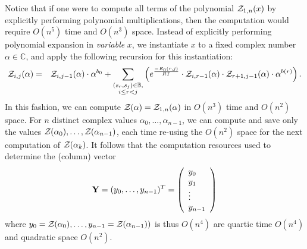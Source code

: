 Notice that if one were to compute all terms of the polynomial ${\mathcal Z}_{1,n}(x)$
by explicitly performing polynomial multiplications,
then the computation would require $O(n^5)$ time and $O(n^3)$ space.
Instead of explicitly performing polynomial expansion in {\em variable} $x$,
we instantiate $x$ to a fixed complex number $\alpha \in \mathbb{C}$, and apply
the following recursion for this instantiation:
\begin{eqnarray}
\label{eqn:RNAborNussRecursionInstantiated}
\emZof{i,j}{\alpha} &= &\emZof{i,j-1}{\alpha} \cdot \alpha^{b_0} +
\sum_{\substack{(s_r,s_j) \in \mathbb{B},\\i\le r<j}}
\left(e^{\frac{-E_0(r,j)}{RT}}\cdot
\emZof{i,r-1}{\alpha}\cdot\emZof{r+1,j-1}{\alpha}\cdot \alpha^{b(r)} \right).
\end{eqnarray}
In this fashion, we can compute ${\mathcal Z}_{}(\alpha)={\mathcal Z}_{1,n}(\alpha)$ in
$O(n^3)$ time and $O(n^2)$ space. For $n$ distinct complex values
$\alpha_0,\ldots,\alpha_{n-1}$, we can compute and save only the
values ${\mathcal Z}_{}(\alpha_0),\ldots, {\mathcal Z}_{}(\alpha_{n-1})$, each time re-using the
$O(n^2)$ space for the next computation of ${\mathcal Z}_{}(\alpha_k)$. It follows that
the computation resources used to determine the (column) vector
\begin{eqnarray}
\label{eqn:defY}
{\bf Y} = (y_0,\ldots,y_{n-1})^T =
\left(
\begin{array}{l}
y_0\\
y_1\\
\vdots \\
y_{n-1}\\
\end{array}
\right)
\end{eqnarray}
where
$y_0={\mathcal Z}_{}(\alpha_0),\ldots, y_{n-1}={\mathcal Z}_{}(\alpha_{n-1}))$ is thus
$O(n^4)$ are quartic time $O(n^4)$ and quadratic space $O(n^2)$.

